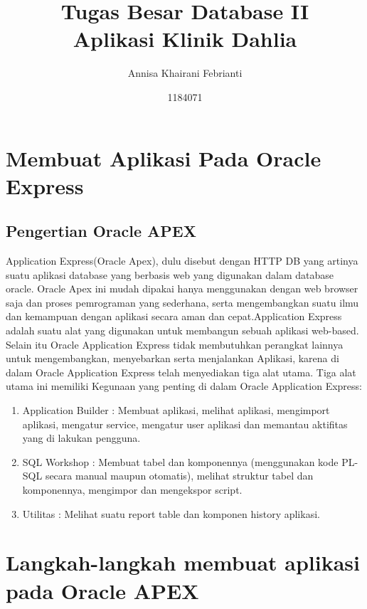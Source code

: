 \documentclass{article}
\title{Tugas Besar Database II \\
Aplikasi Klinik Dahlia}
\author{Annisa Khairani Febrianti}
\date{1184071}
\begin{document}
\maketitle

\section{Membuat Aplikasi Pada Oracle Express}
\subsection{Pengertian Oracle APEX}
 Application Express(Oracle Apex), dulu disebut dengan HTTP DB yang artinya suatu aplikasi database yang berbasis web yang digunakan dalam database oracle. Oracle Apex ini mudah dipakai hanya menggunakan dengan web browser saja dan proses pemrograman yang sederhana, serta mengembangkan suatu ilmu dan kemampuan dengan aplikasi secara aman dan cepat.Application Express adalah suatu alat yang digunakan untuk membangun sebuah aplikasi web-based. Selain itu Oracle Application Express tidak membutuhkan perangkat lainnya untuk mengembangkan, menyebarkan serta menjalankan Aplikasi, karena di dalam Oracle Application Express telah menyediakan tiga alat utama. Tiga alat utama ini memiliki Kegunaan yang penting di dalam Oracle Application Express:
\begin{enumerate}
    \item Application Builder : Membuat aplikasi, melihat aplikasi, mengimport aplikasi, mengatur service, mengatur user aplikasi dan memantau aktifitas yang di lakukan pengguna.
    \item SQL Workshop : Membuat tabel dan komponennya (menggunakan kode PL-SQL secara manual maupun otomatis), melihat struktur tabel dan komponennya, mengimpor dan mengekspor script. 
    \item  Utilitas : Melihat suatu report table dan komponen history aplikasi.
\end{enumerate}
\newpage \section{Langkah-langkah membuat aplikasi pada Oracle APEX}
\end{document}
